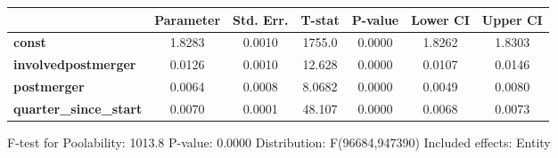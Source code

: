 \documentclass{report}
\begin{document}
\begin{center}
\begin{tabular}{lcccccc}
                               & \textbf{Parameter} & \textbf{Std. Err.} & \textbf{T-stat} & \textbf{P-value} & \textbf{Lower CI} & \textbf{Upper CI}  \\
\midrule
\textbf{const}                 &       1.8283       &       0.0010       &      1755.0     &      0.0000      &       1.8262      &       1.8303       \\
\textbf{involvedpostmerger}    &       0.0126       &       0.0010       &      12.628     &      0.0000      &       0.0107      &       0.0146       \\
\textbf{postmerger}            &       0.0064       &       0.0008       &      8.0682     &      0.0000      &       0.0049      &       0.0080       \\
\textbf{quarter\_since\_start} &       0.0070       &       0.0001       &      48.107     &      0.0000      &       0.0068      &       0.0073       \\
\bottomrule
\end{tabular}
\end{center}

F-test for Poolability: 1013.8 \newline
 P-value: 0.0000 \newline
 Distribution: F(96684,947390) \newline
  \newline
 Included effects: Entity
\end{document}
